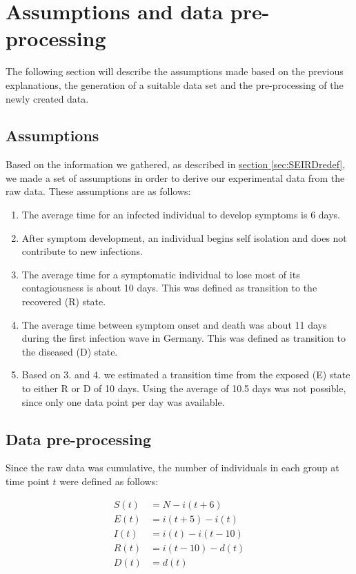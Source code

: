 \section{Assumptions and data pre-processing}
The following section will describe the assumptions made based on the previous explanations, the generation of a suitable data set and
the pre-processing of the newly created data.


\subsection{Assumptions}
Based on the information we gathered, as described in \hyperref[sec:SERIDredef]{section \ref*{sec:SEIRDredef}}, we made a set of assumptions
in order to derive our experimental data from the raw data. These assumptions are as follows:

\begin{enumerate}
	\item The average time for an infected individual to develop symptoms is 6 days.
	\item After symptom development, an individual begins self isolation and does not contribute to new infections.
	\item The average time for a symptomatic individual to lose most of its contagiousness is about 10 days. This was defined as
		transition to the recovered (R) state.
	\item The average time between symptom onset and death was about 11 days during the first infection wave in Germany. This was
		defined as transition to the diseased (D) state.
	\item Based on 3. and 4. we estimated a transition time from the exposed (E) state to either R or D of 10 days. Using the
		average of 10.5 days was not possible, since only one data point per day was available.
\end{enumerate}


\subsection{Data pre-processing}
Since the raw data was cumulative, the number of individuals in each group at time point $t$ were defined as follows:

\begin{align}
	S(t) &= N - i(t+6)\\
	E(t) &= i(t+5) - i(t)\\
	I(t) &= i(t) - i(t-10)\\
	R(t) &= i(t-10) - d(t)\\
	D(t) &= d(t)
\end{align}

